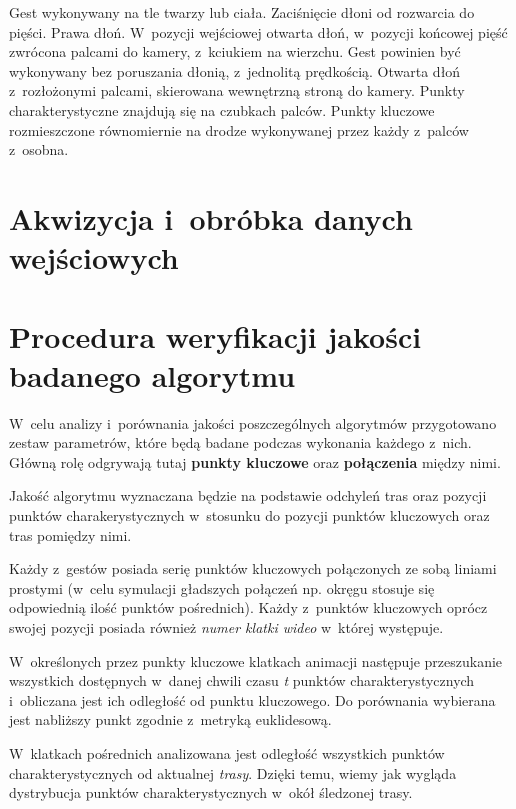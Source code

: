     \newpage
         {Gest wykonywany na tle twarzy lub ciała.}
         {Zaciśnięcie dłoni od rozwarcia do pięści.}
         {Prawa dłoń.}
         {W~pozycji wejściowej otwarta dłoń, w~pozycji końcowej pięść zwrócona palcami do kamery, z~kciukiem na wierzchu.}
         {Gest powinien być wykonywany bez poruszania dłonią, z~jednolitą prędkością.}
         {Otwarta dłoń z~rozłożonymi palcami, skierowana wewnętrzną stroną do kamery.}
         {Punkty charakterystyczne znajdują się na czubkach palców.}
         {Punkty kluczowe rozmieszczone równomiernie na drodze wykonywanej przez każdy z~palców z~osobna.}

  \section{Akwizycja i~obróbka danych wejściowych}\label{Section_Akwizycja}

  \section{Procedura weryfikacji jakości badanego algorytmu}\label{Section_Jakosc}

    W~celu analizy i~porównania jakości poszczególnych algorytmów przygotowano zestaw parametrów, które będą badane podczas wykonania każdego z~nich. Główną rolę odgrywają tutaj \textbf{punkty kluczowe} oraz \textbf{połączenia} między nimi.

    Jakość algorytmu wyznaczana będzie na podstawie odchyleń tras oraz pozycji punktów charakerystycznych w~stosunku do pozycji punktów kluczowych oraz tras pomiędzy nimi.

    Każdy z~gestów posiada serię punktów kluczowych połączonych ze sobą liniami prostymi (w~celu symulacji gładszych połączeń np. okręgu stosuje się odpowiednią ilość punktów pośrednich). Każdy z~punktów kluczowych oprócz swojej pozycji posiada również \textit{numer klatki wideo} w~której występuje.

    W~określonych przez punkty kluczowe klatkach animacji następuje przeszukanie wszystkich dostępnych w~danej chwili czasu \textit{t} punktów charakterystycznych i~obliczana jest ich odległość od punktu kluczowego. Do porównania wybierana jest nabliższy punkt zgodnie z~metryką euklidesową.

    W~klatkach pośrednich analizowana jest odległość wszystkich punktów charakterystycznych od aktualnej \textit{trasy}. Dzięki temu, wiemy jak wygląda dystrybucja punktów charakterystycznych w~okół śledzonej trasy.

